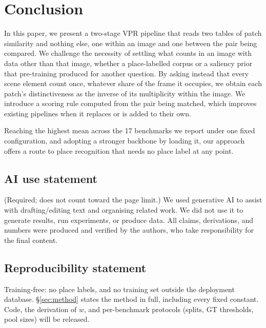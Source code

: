 \section{Conclusion}
In this paper, we present a two-stage VPR pipeline that reads two tables of patch similarity and nothing else, one within an image and one between the pair being compared. We challenge the necessity of settling what counts in an image with data other than that image, whether a place-labelled corpus or a saliency prior that pre-training produced for another question. By asking instead that every scene element count once, whatever share of the frame it occupies, we obtain each patch's distinctiveness as the inverse of its multiplicity within the image. We introduce a scoring rule computed from the pair being matched, which improves existing pipelines when it replaces or is added to their own.

Reaching the highest mean across the 17 benchmarks we report under one fixed configuration, and adopting a stronger backbone by loading it, our approach offers a route to place recognition that needs no place label at any point.

\subsection*{AI use statement}
(Required; does not count toward the page limit.) We used generative AI to assist with drafting/editing text and organising related work. We did not use it to generate results, run experiments, or produce data. All claims, derivations, and numbers were produced and verified by the authors, who take responsibility for the final content.

\subsection*{Reproducibility statement}
Training-free: no place labels, and no training set outside the deployment database. \S\ref{sec:method} states the method in full, including every fixed constant. Code, the derivation of $w$, and per-benchmark protocols (splits, GT thresholds, pool sizes) will be released.

